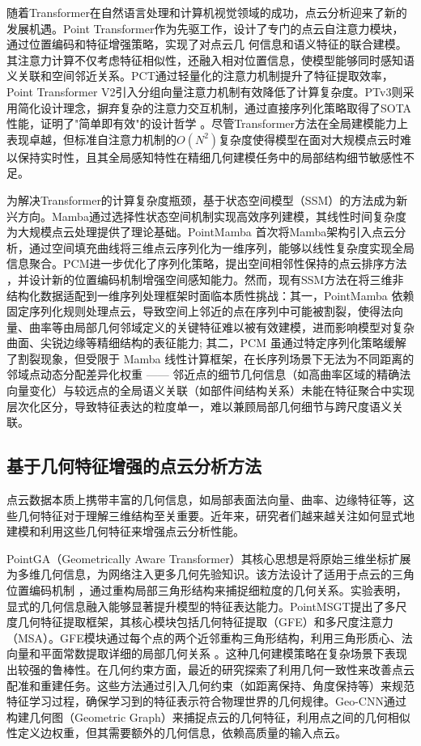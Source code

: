 \documentclass[preprint,12pt]{elsarticle}
\begin{document}
随着Transformer在自然语言处理和计算机视觉领域的成功，点云分析迎来了新的发展机遇。Point Transformer\cite{pt}作为先驱工作，设计了专门的点云自注意力模块，通过位置编码和特征增强策略，实现了对点云几
何信息和语义特征的联合建模。其注意力计算不仅考虑特征相似性，还融入相对位置信息，使模型能够同时感知语义关联和空间邻近关系。PCT\cite{PCT}通过轻量化的注意力机制提升了特征提取效率，Point
Transformer V2\cite{ptv2}引入分组向量注意力机制有效降低了计算复杂度。PTv3\cite{ptv3}则采用简化设计理念，摒弃复杂的注意力交互机制，通过直接序列化策略取得了SOTA性能，证明了"简单即有效"的设计哲学      
。尽管Transformer方法在全局建模能力上表现卓越，但标准自注意力机制的$O(N^2)$复杂度使得模型在面对大规模点云时难以保持实时性，且其全局感知特性在精细几何建模任务中的局部结构细节敏感性不足。

为解决Transformer的计算复杂度瓶颈，基于状态空间模型（SSM）的方法成为新兴方向。Mamba\cite{Mamba}通过选择性状态空间机制实现高效序列建模，其线性时间复杂度为大规模点云处理提供了理论基础。PointMamba     
\cite{PointMamba}首次将Mamba架构引入点云分析，通过空间填充曲线将三维点云序列化为一维序列，能够以线性复杂度实现全局信息聚合。PCM\cite{pcm}进一步优化了序列化策略，提出空间相邻性保持的点云排序方法     
，并设计新的位置编码机制增强空间感知能力。然而，现有SSM方法在将三维非结构化数据适配到一维序列处理框架时面临本质性挑战：其一，PointMamba 依赖固定序列化规则处理点云，导致空间上邻近的点在序列中可能被割裂，使得法向量、曲率等由局部几何邻域定义的关键特征难以被有效建模，进而影响模型对复杂曲面、尖锐边缘等精细结构的表征能力;
其二，PCM 虽通过特定序列化策略缓解了割裂现象，但受限于 Mamba 线性计算框架，在长序列场景下无法为不同距离的邻域点动态分配差异化权重 —— 邻近点的细节几何信息（如高曲率区域的精确法向量变化）与较远点的全局语义关联（如部件间结构关系）未能在特征聚合中实现层次化区分，导致特征表达的粒度单一，难以兼顾局部几何细节与跨尺度语义关联。
\subsection{基于几何特征增强的点云分析方法}
点云数据本质上携带丰富的几何信息，如局部表面法向量、曲率、边缘特征等，这些几何特征对于理解三维结构至关重要。近年来，研究者们越来越关注如何显式地建模和利用这些几何特征来增强点云分析性能。

PointGA（Geometrically Aware Transformer）\cite{pointga}其核心思想是将原始三维坐标扩展为多维几何信息，为网络注入更多几何先验知识。该方法设计了适用于点云的三角位置编码机制     
，通过重构局部三角形结构来捕捉细粒度的几何关系。实验表明，显式的几何信息融入能够显著提升模型的特征表达能力。PointMSGT\cite{pointmsgt}提出了多尺度几何特征提取框架，其核心模块包括几何特征提取（GFE）和多尺度注意力（MSA）。GFE模块通过每个点的两个近邻重构三角形结构，利用三角形质心、法向量和平面常数提取详细的局部几何关系      
。这种几何建模策略在复杂场景下表现出较强的鲁棒性。在几何约束方面，最近的研究\cite{gsrnet,geotransformer}探索了利用几何一致性来改善点云配准和重建任务。这些方法通过引入几何约束（如距离保持、角度保持等）来规范特征学习过程，确保学习到的特征表示符合物理世界的几何规律。Geo-CNN\cite{geo-cnn}通过构建几何图（Geometric
Graph）来捕捉点云的几何特征，利用点之间的几何相似性定义边权重，但其需要额外的几何信息，依赖高质量的输入点云。
\end{document}
